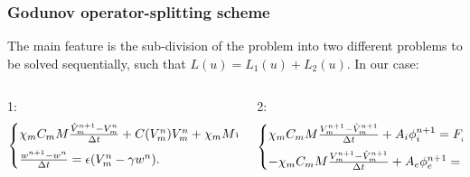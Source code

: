 \documentclass[8pt]{beamer}
\begin{document}
\begin{frame}
\frametitle{Godunov operator-splitting scheme}
The main feature is the sub-division of the problem into two different problems to be solved sequentially, such that $L(u)=L_1(u)+L_2(u)$. In our case:
\vspace{2mm}
\begin{columns}
            \begin{column}{0.5\textwidth}
\small 1:
 \begin{equation*}
\begin{cases}
\chi_m C_m M\frac{\hat{V}_m^{n+1} - V_m^n}{\Delta t} + C(V_m^n)V_m^n +\chi_mMw^n = 0,\vspace{2mm}\\
\frac{w^{n+1}-w^n}{\Delta t} = \epsilon (V_m^n - \gamma w^n).
\end{cases}
\end{equation*}
            \end{column}
            \hspace{1cm}
            \begin{column}{0.5\textwidth}  
            \small 2:
\begin{equation*}
\begin{cases}
\chi_m C_m M\frac{V_m^{n+1} - \hat{V}_m^{n+1}}{\Delta t} + A_i\phi_i^{n+1} = F_i^{n+1}, \vspace{2mm}\\
-\chi_m C_m M\frac{V_m^{n+1} - \hat{V}_m^{n+1}}{\Delta t} + A_e\phi_e^{n+1} = F_e^{n+1}.
\end{cases}
\end{equation*}


\end{column}
\end{columns}
\end{frame}
\end{document}
